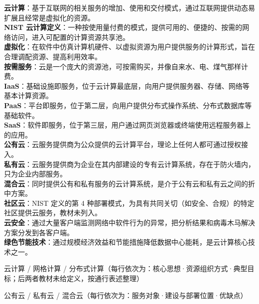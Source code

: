 \documentclass[a4paper,11pt]{article}
\begin{document}
\begin{keyterms}
\textbf{云计算}：基于互联网的相关服务的增加、使用和交付模式，通过互联网提供动态易扩展且经常是虚拟化的资源。\\
\textbf{NIST 云计算定义}：一种按使用量付费的模式，提供可用的、便捷的、按需的网络访问，进入可配置的计算资源共享池。\\
\textbf{虚拟化}：在软件中仿真计算机硬件、以虚拟资源为用户提供服务的计算形式，旨在合理调配资源、提高利用效率。\\
\textbf{按需服务}：云是一个庞大的资源池，可按需购买，并像自来水、电、煤气那样计费。\\
\textbf{IaaS}：基础设施即服务，位于云计算最底层，向用户提供服务器、存储、网络等基本计算资源。\\
\textbf{PaaS}：平台即服务，位于第二层，向用户提供分布式操作系统、分布式数据库等基础软件。\\
\textbf{SaaS}：软件即服务，位于第三层，用户通过网页浏览器或终端使用远程服务器上的应用。\\
\textbf{公有云}：云服务提供商为公众提供的云计算平台，理论上任何人都可通过授权接入。\\
\textbf{私有云}：云服务提供商为企业在其内部建设的专有云计算系统，存在于防火墙内，只为企业内部服务。\\
\textbf{混合云}：同时提供公有和私有服务的云计算系统，是介于公有云和私有云之间的折中方案。\\
\textbf{社区云}：NIST 定义的第 4 种部署模式，为具有共同关切（如安全、合规）的特定社区提供云服务，教材未列入。\\
\textbf{云安全}：通过大量客户端监测网络中软件行为的异常，把分析结果和病毒木马解决方案分发到各客户端。\\
\textbf{绿色节能技术}：通过规模经济效益和节能措施降低数据中心能耗，是云计算核心技术之一。
\end{keyterms}

\begin{contrast}{云计算 / 网格计算 / 分布式计算（每行依次为：核心思想·资源组织方式·典型目标；后两者教材未给定义，按通行表述整理）}
\end{contrast}

\begin{contrast}{公有云 / 私有云 / 混合云（每行依次为：服务对象·建设与部署位置·优缺点）}
\end{contrast}
\end{document}
